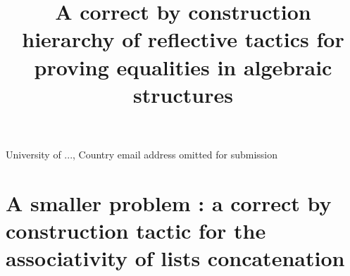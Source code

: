 \documentclass{sigplanconf}
\begin{document}
\setlength{\pdfpageheight}{\paperheight}
\setlength{\pdfpagewidth}{\paperwidth}









\title{A correct by construction hierarchy of reflective tactics for proving equalities in algebraic structures}

           {University of ..., Country}
           {email address omitted for submission}



\maketitle

\nocite{*}










         
\section* {A smaller problem : a correct by construction tactic for the associativity of lists concatenation}
\end{document}
